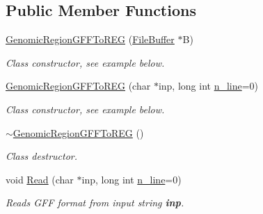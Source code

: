 \subsection*{Public Member Functions}
\begin{CompactItemize}
\item 
\hypertarget{classGenomicRegionGFFToREG_8ad38850fd8e7e19aabca0bf2ba62d55}{
\hyperlink{classGenomicRegionGFFToREG_8ad38850fd8e7e19aabca0bf2ba62d55}{GenomicRegionGFFToREG} (\hyperlink{classFileBuffer}{FileBuffer} $\ast$B)}
\label{classGenomicRegionGFFToREG_8ad38850fd8e7e19aabca0bf2ba62d55}

\begin{CompactList}\small\item\em Class constructor, see example below. \item\end{CompactList}\item 
\hypertarget{classGenomicRegionGFFToREG_fa25d23d19de119347fe6970913398b8}{
\hyperlink{classGenomicRegionGFFToREG_fa25d23d19de119347fe6970913398b8}{GenomicRegionGFFToREG} (char $\ast$inp, long int \hyperlink{classGenomicRegion_efe2255aeed5338060190ded05cb9c0c}{n\_\-line}=0)}
\label{classGenomicRegionGFFToREG_fa25d23d19de119347fe6970913398b8}

\begin{CompactList}\small\item\em Class constructor, see example below. \item\end{CompactList}\item 
\hypertarget{classGenomicRegionGFFToREG_5a41c3de64cd8ad69952b77805816c5e}{
\hyperlink{classGenomicRegionGFFToREG_5a41c3de64cd8ad69952b77805816c5e}{$\sim$GenomicRegionGFFToREG} ()}
\label{classGenomicRegionGFFToREG_5a41c3de64cd8ad69952b77805816c5e}

\begin{CompactList}\small\item\em Class destructor. \item\end{CompactList}\item 
\hypertarget{classGenomicRegionGFFToREG_bc519dd06e8d03711b90679ec279be3b}{
void \hyperlink{classGenomicRegionGFFToREG_bc519dd06e8d03711b90679ec279be3b}{Read} (char $\ast$inp, long int \hyperlink{classGenomicRegion_efe2255aeed5338060190ded05cb9c0c}{n\_\-line}=0)}
\label{classGenomicRegionGFFToREG_bc519dd06e8d03711b90679ec279be3b}

\begin{CompactList}\small\item\em Reads GFF format from input string {\bf inp}. \item\end{CompactList}\end{CompactItemize}


